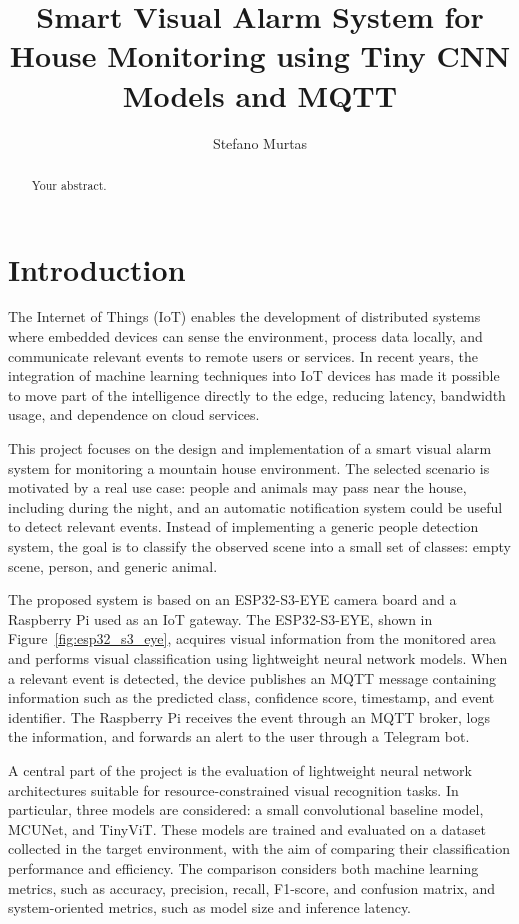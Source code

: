\documentclass{article}
\title{Smart Visual Alarm System for House Monitoring using Tiny CNN Models and MQTT}
\author{Stefano Murtas}
\begin{document}
\maketitle

\begin{abstract}
Your abstract.
\end{abstract}

\section{Introduction}

The Internet of Things (IoT) enables the development of distributed systems where embedded devices can sense the environment, process data locally, and communicate relevant events to remote users or services. In recent years, the integration of machine learning techniques into IoT devices has made it possible to move part of the intelligence directly to the edge, reducing latency, bandwidth usage, and dependence on cloud services.

This project focuses on the design and implementation of a smart visual alarm system for monitoring a mountain house environment. The selected scenario is motivated by a real use case: people and animals may pass near the house, including during the night, and an automatic notification system could be useful to detect relevant events. Instead of implementing a generic people detection system, the goal is to classify the observed scene into a small set of classes: empty scene, person, and generic animal.

The proposed system is based on an ESP32-S3-EYE camera board and a Raspberry Pi used as an IoT gateway. The ESP32-S3-EYE, shown in Figure~\ref{fig:esp32_s3_eye},  acquires visual information from the monitored area and performs visual classification using lightweight neural network models. When a relevant event is detected, the device publishes an MQTT message containing information such as the predicted class, confidence score, timestamp, and event identifier. The Raspberry Pi receives the event through an MQTT broker, logs the information, and forwards an alert to the user through a Telegram bot.

A central part of the project is the evaluation of lightweight neural network architectures suitable for resource-constrained visual recognition tasks. In particular, three models are considered: a small convolutional baseline model, MCUNet, and TinyViT. These models are trained and evaluated on a dataset collected in the target environment, with the aim of comparing their classification performance and efficiency. The comparison considers both machine learning metrics, such as accuracy, precision, recall, F1-score, and confusion matrix, and system-oriented metrics, such as model size and inference latency.
\end{document}
